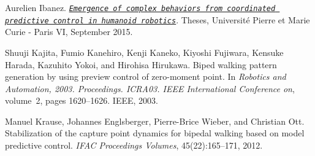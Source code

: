 
\begin{DoxyDescription}
\item[\label{_CITEREF_ibanezThesis2015}%
\mbox{[}1\mbox{]}]Aurelien Ibanez. \href{http://hal.upmc.fr/tel-01308723}{\tt {\itshape Emergence of complex behaviors from coordinated predictive control in humanoid robotics}}. Theses, Universit\'{e} Pierre et Marie Curie -\/ Paris VI, September 2015. 


\item[\label{_CITEREF_kajita2003biped}%
\mbox{[}2\mbox{]}]Shuuji Kajita, Fumio Kanehiro, Kenji Kaneko, Kiyoshi Fujiwara, Kensuke Harada, Kazuhito Yokoi, and Hirohisa Hirukawa. Biped walking pattern generation by using preview control of zero-\/moment point. In {\itshape Robotics and Automation, 2003. Proceedings. I\+C\+RA\textquotesingle{}03. I\+E\+EE International Conference on}, volume~2, pages 1620--1626. I\+E\+EE, 2003.


\item[\label{_CITEREF_krause2012stabilization}%
\mbox{[}3\mbox{]}]Manuel Krause, Johannes Englsberger, Pierre-\/\+Brice Wieber, and Christian Ott. Stabilization of the capture point dynamics for bipedal walking based on model predictive control. {\itshape I\+F\+AC Proceedings Volumes}, 45(22)\+:165--171, 2012.


\end{DoxyDescription}